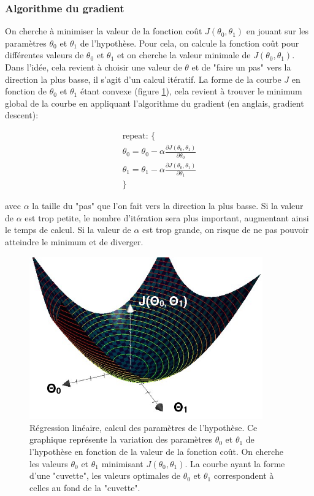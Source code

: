 \subsubsection{Algorithme du gradient}
On cherche à minimiser la valeur de la fonction coût $J(\theta_0,\theta_1)$ en jouant sur les paramètres $\theta_0$ et $\theta_1$ de l'hypothèse. Pour cela, on calcule la fonction coût pour différentes valeurs de $\theta_0$ et $\theta_1$ et on cherche la valeur minimale de $J(\theta_0,\theta_1)$. Dans l'idée, cela revient à choisir une valeur de $\theta$ et de "faire un pas" vers la direction la plus basse, il s'agit d'un calcul itératif. La forme de la courbe $J$ en fonction de  $\theta_0$ et $\theta_1$ étant convexe (figure \ref{fig:Régression linéaire, calcul des paramètres de l'hypothèse}), cela revient à trouver le minimum global de la courbe en appliquant l'algorithme du gradient (en anglais, gradient descent):

\begin{equation}
	\begin{split}
		\text{repeat: \{} \\
		\theta_0 = \theta_0 - \alpha \frac{\partial J(\theta_0,\theta_1)}{\partial\theta_0} \\
		\theta_1 = \theta_1 - \alpha \frac{\partial J(\theta_0,\theta_1)}{\partial\theta_1} \\
		\text{\}}
	\end{split}
\end{equation}

avec $\alpha$ la taille du "pas" que l'on fait vers la direction la plus basse. Si la valeur de $\alpha$ est trop petite, le nombre d'itération sera plus important, augmentant ainsi le temps de calcul. Si la valeur de $\alpha$ est trop grande, on risque de ne pas pouvoir atteindre le minimum et de diverger.  

\begin{figure}[h]
	\centering\includegraphics[height=7cm]{images/gradient.png}
	\caption[Régression linéaire, calcul des paramètres de l'hypothèse]{Régression linéaire, calcul des paramètres de l'hypothèse. Ce graphique représente la variation des paramètres $\theta_0$ et $\theta_1$ de l'hypothèse en fonction de la valeur de la fonction coût. On cherche les valeurs  $\theta_0$ et $\theta_1$ minimisant $J(\theta_0,\theta_1)$. La courbe ayant la forme d'une "cuvette", les valeurs optimales de $\theta_0$ et $\theta_1$ correspondent à celles au fond de la "cuvette".}
	\label{fig:Régression linéaire, calcul des paramètres de l'hypothèse}
\end{figure}
 
